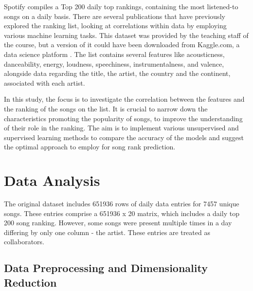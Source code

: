 \documentclass{article}
\begin{document}
Spotify compiles a Top 200 daily top rankings, containing the most listened-to songs on a daily basis. There are several publications that have previously explored the ranking list, looking at correlations within data by employing various machine learning tasks. \cite{Luo2018} This dataset was provided by the teaching staff of the course, but a version of it could have been downloaded from Kaggle.com, a data science platform \cite{kaggle2024top200}. The list contains several features like acousticness, danceability, energy, loudness, speechiness, instrumentalness, and valence, alongside data regarding the title, the artist, the country and the continent, associated with each artist.

In this study, the focus is to investigate the correlation between the features and the ranking of the songs on the list. It is crucial to narrow down the characteristics promoting the popularity of songs, to improve the understanding of their role in the ranking. The aim is to implement various unsupervised and supervised learning methods to compare the accuracy of the models and suggest the optimal approach to employ for song rank prediction.


\section{Data Analysis}
The original dataset includes 651936 rows of daily data entries for 7457 unique songs. These entries comprise a 651936 x 20 matrix, which includes a daily top 200 song ranking. However, some songs were present multiple times in a day differing by only one column - the artist. These entries are treated as collaborators.

\subsection{Data Preprocessing and Dimensionality Reduction}
\end{document}
